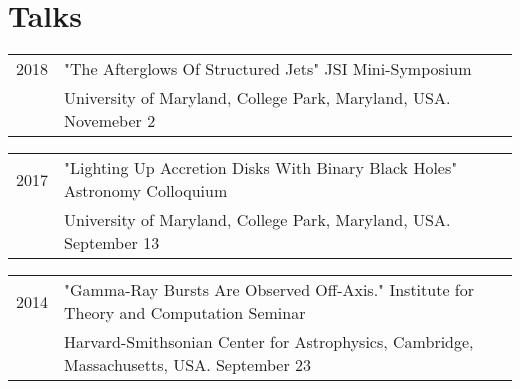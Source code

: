 \documentclass[letterpaper]{article}
\renewenvironment{itemize}{
  \begin{list}{}{
    \setlength{\leftmargin}{1.5em}
  }
}{
  \end{list}
}
\begin{document}
\section*{Talks}
\begin{itemize}
\item \begin{tabular}{ll}
2018 & "The Afterglows Of Structured Jets" JSI Mini-Symposium  \\
	& University of Maryland, College Park, Maryland, USA.  Novemeber 2
\end{tabular}

\item \begin{tabular}{ll}
2017 & "Lighting Up Accretion Disks With Binary Black Holes" Astronomy Colloquium  \\
	& University of Maryland, College Park, Maryland, USA.  September 13
\end{tabular}

\item \begin{tabular}{ll}
2014 & "Gamma-Ray Bursts Are Observed Off-Axis." Institute for Theory and Computation Seminar  \\
	& Harvard-Smithsonian Center for Astrophysics, Cambridge, Massachusetts, USA.  September 23
\end{tabular}
\end{itemize}

\end{document}
